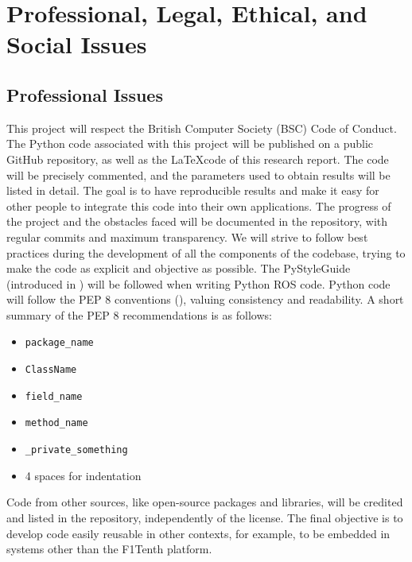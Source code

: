 
\chapter{Professional, Legal, Ethical, and Social Issues} %

\label{AppendixB} %



\section{Professional Issues}
\label{proiss}
This project will respect the British Computer Society (BSC) Code of Conduct. \newline
The Python code associated with this project will be published on a public GitHub repository, as well as the \LaTeX code of this research report. The code will be precisely commented, and the parameters used to obtain results will be listed in detail. The goal is to have reproducible results and make it easy for other people to integrate this code into their own applications.
\newline
The progress of the project and the obstacles faced will be documented in the repository, with regular commits and maximum transparency. We will strive to follow best practices during the development of all the components of the codebase, trying to make the code as explicit and objective as possible. The PyStyleGuide (introduced in \cite{rossyntax}) will be followed when writing Python ROS code. Python code will follow the PEP 8 conventions (\cite{pysyntax}), valuing consistency and readability. A short summary of the PEP 8 recommendations is as follows:
\begin{itemize}
	\item \verb |package_name|
	\item \verb |ClassName|
	\item \verb |field_name|
	\item \verb |method_name|
	\item \verb |_private_something|
	\item 4 spaces for indentation
\end{itemize}

Code from other sources, like open-source packages and libraries, will be credited and listed in the repository, independently of the license.
\newline
The final objective is to develop code easily reusable in other contexts, for example, to be embedded in systems other than the F1Tenth platform.
